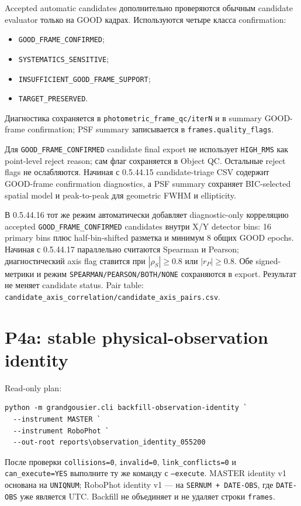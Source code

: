 Accepted automatic candidates дополнительно проверяются обычным candidate evaluator только на GOOD
кадрах. Используются четыре класса confirmation:
\begin{itemize}
  \item \texttt{GOOD\_FRAME\_CONFIRMED};
  \item \texttt{SYSTEMATICS\_SENSITIVE};
  \item \texttt{INSUFFICIENT\_GOOD\_FRAME\_SUPPORT};
  \item \texttt{TARGET\_PRESERVED}.
\end{itemize}
Диагностика сохраняется в \texttt{photometric\_frame\_qc/iterN} и в summary GOOD-frame
confirmation; PSF summary записывается в \texttt{frames.quality\_flags}.

Для \texttt{GOOD\_FRAME\_CONFIRMED} candidate final export не использует \texttt{HIGH\_RMS} как
point-level reject reason; сам флаг сохраняется в Object QC. Остальные reject flags не ослабляются.
Начиная с 0.5.44.15 candidate-triage CSV содержит GOOD-frame confirmation diagnostics, а PSF summary
сохраняет BIC-selected spatial model и peak-to-peak для geometric FWHM и ellipticity.

В 0.5.44.16 тот же режим автоматически добавляет diagnostic-only корреляцию accepted
\texttt{GOOD\_FRAME\_CONFIRMED} candidates внутри X/Y detector bins: 16 primary bins плюс
half-bin-shifted разметка и минимум 8 общих GOOD epochs. Начиная с 0.5.44.17 параллельно считаются
Spearman и Pearson; диагностический axis flag ставится при $|\rho_S|\ge0.8$ или $|r_P|\ge0.8$.
Обе signed-метрики и режим \texttt{SPEARMAN/PEARSON/BOTH/NONE} сохраняются в export.
Результат не меняет candidate status. Pair table: \texttt{candidate\_axis\_correlation/candidate\_axis\_pairs.csv}.


\section{P4a: stable physical-observation identity}

Read-only plan:

\begin{lstlisting}
python -m grandgousier.cli backfill-observation-identity `
  --instrument MASTER `
  --instrument RoboPhot `
  --out-root reports\observation_identity_055200
\end{lstlisting}

После проверки \texttt{collisions=0}, \texttt{invalid=0}, \texttt{link\_conflicts=0} и \texttt{can\_execute=YES} выполните ту же команду с \texttt{--execute}. MASTER identity v1 основана на \texttt{UNIQNUM}; RoboPhot identity v1 --- на \texttt{SERNUM + DATE-OBS}, где \texttt{DATE-OBS} уже является UTC. Backfill не объединяет и не удаляет строки \texttt{frames}.

